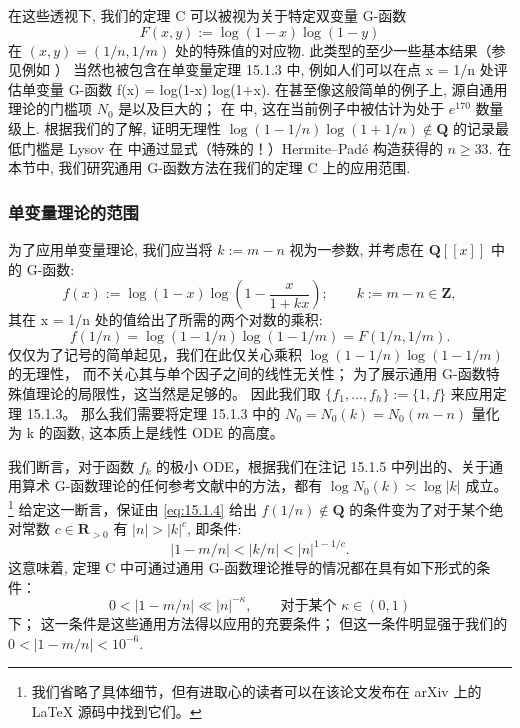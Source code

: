 在这些透视下, 我们的定理 C 可以被视为关于特定双变量 G-函数
\begin{equation}\label{eq:15.1.6}
F(x,y) := \log(1-x)\log(1-y)
\end{equation}
在 \((x, y) = (1/n, 1/m)\) 处的特殊值的对应物. 
此类型的至少一些基本结果（参见例如 \cite{Gal74}\cite{Gal75}\cite{Gal96}\cite{Hat98}\cite{Lys18}） 
当然也被包含在单变量定理 15.1.3 中, 
例如人们可以在点 x = 1/n 处评估单变量 G-函数 f(x) = log(1-x) log(1+x). 
在甚至像这般简单的例子上, 
源自通用理论的门槛项 \(N_0\) 是以及巨大的； 
在 \cite{Hat98} 中, 这在当前例子中被估计为处于 \(e^{170}\) 数量级上. 
根据我们的了解, 证明无理性 \(\log(1 - 1/n) \log(1 + 1/n) \notin \mathbf{Q}\) 的记录最低门槛是 Lysov 在 \cite{Lys18} 中通过显式（特殊的！）Hermite--Pad{\'e} 构造获得的 \(n \geq 33\). 
在本节中, 我们研究通用 G-函数方法在我们的定理 C 上的应用范围.

\subsubsection{单变量理论的范围}\label{sec:15.1.7}

为了应用单变量理论, 我们应当将 \(k := m - n\) 视为一参数, 
并考虑在 \(\mathbf{Q}[\![x]\!]\) 中的 G-函数:
\begin{equation}\label{eq:15.1.8}
f(x) := \log(1-x)\log\left(1-\frac{x}{1+kx}\right); \qquad k := m-n \in \mathbf{Z},
\end{equation}
其在 x = 1/n 处的值给出了所需的两个对数的乘积:
\[ f(1/n) = \log(1 - 1/n)\log(1 - 1/m) = F(1/n, 1/m). \]
仅仅为了记号的简单起见，我们在此仅关心乘积 \(\log(1 - 1/n) \log(1 - 1/m)\) 的无理性，
而不关心其与单个因子之间的线性无关性； 
为了展示通用 G-函数特殊值理论的局限性，这当然是足够的。 
因此我们取 \(\{f_1, \dots, f_h\} := \{1, f\}\) 来应用定理 15.1.3。 
那么我们需要将定理 15.1.3 中的 \(N_0 = N_0(k) = N_0(m - n)\) 量化为 k 的函数, 
这本质上是线性 ODE 的高度。

我们断言，对于函数 \(f_k\) 的极小 ODE，根据我们在注记 15.1.5 中列出的、关于通用算术 G-函数理论的任何参考文献中的方法，都有 \(\log N_0(k) \asymp \log |k|\) 成立。\setcounter{footnote}{40}\footnote{我们省略了具体细节，但有进取心的读者可以在该论文发布在 arXiv 上的 LaTeX 源码中找到它们。}
给定这一断言，保证由 \eqref{eq:15.1.4} 给出 \(f(1/n) \notin \mathbf{Q}\) 的条件变为了对于某个绝对常数 \(c \in \mathbf{R}_{>0}\) 有 \(|n| > |k|^c\), 
即条件:
\[ |1 - m/n| < |k/n| < |n|^{1 - 1/c}. \]
这意味着, 定理 C 中可通过通用 G-函数理论推导的情况都在具有如下形式的条件：
\[ 0 < |1 - m/n| \ll |n|^{-\kappa}, \qquad \text{对于某个 } \kappa \in (0, 1) \]
下； 
这一条件是这些通用方法得以应用的充要条件； 
但这一条件明显强于我们的 \(0 < |1 - m/n| < 10^{-6}\).

